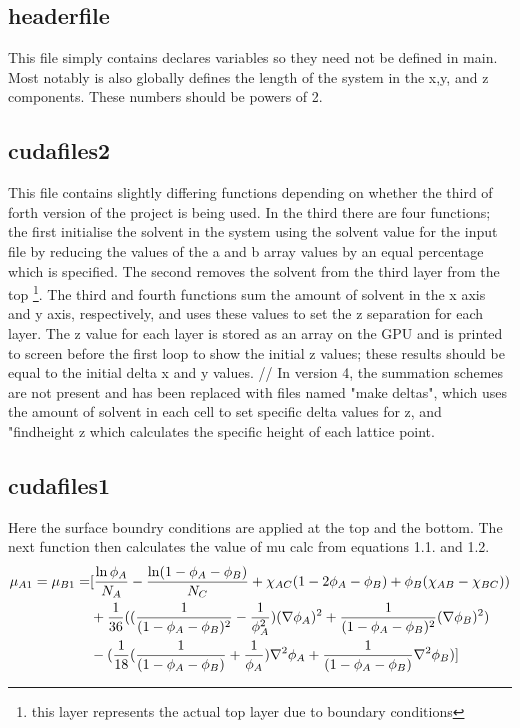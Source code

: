 \documentclass{article}
\numberwithin{equation}{section} %
\begin{document}
\subsection{headerfile} This file simply contains declares variables so they need not be defined in main. Most notably is also globally defines the length of the system in the x,y, and z components. These numbers should be powers of 2. 

\subsection{cudafiles2} This file contains slightly differing functions depending on whether the third of forth version of the project is being used. In the third there are four functions; the first initialise the solvent in the system using the solvent value for the input file by reducing the values of the a and b array values by an equal percentage which is specified. The second removes the solvent from the third layer from the top \footnote{this layer represents the actual top layer due to boundary conditions}. The third  and fourth functions sum the amount of solvent in the x axis and y axis, respectively, and uses these values to set the z separation for each layer. The z value for each layer is stored as an array on the GPU and is printed to screen before the first loop to show the initial z values; these results should be equal to the initial delta x and y values. //
In version 4, the summation schemes are not present and has been replaced with files named "make deltas", which uses the amount of solvent in each cell to set specific delta values for z, and "find\textunderscore height \textunderscore z which calculates the specific height of each lattice point. 

\subsection{cudafiles1}  Here the surface boundry conditions are applied at the top and the bottom. The next function then calculates the value of mu calc from equations 1.1. and 1.2.  \begin{align}
\mu _{A1} = \mu _{B1} = &[\frac{\ln \phi _{A}}{N_{A}} - \frac{\ln (1- \phi _{A} - \phi _{B})}{N_{C}}+\chi _{AC}(1-2\phi _{A} - \phi _{B})+\phi _{B}(\chi _{AB} - \chi _{BC}))  \notag \\
& + \frac{1}{36}((\frac{1}{(1 - \phi _{A} - \phi _{B})^2} - \frac{1}{\phi _{A}^2})(\nabla \phi _{A})^2 +\frac{1}{(1-\phi _{A} - \phi _{B})^2}(\nabla \phi _{B})^2) \notag \\
& -(\frac{1}{18}(\frac{1}{(1- \phi _{A} - \phi _{B})} + \frac{1}{\phi _{A}})\nabla ^2\phi _{A} + \frac{1}{(1 - \phi _{A} - \phi _{B})}\nabla ^2\phi _{B})]
\end{align}
\end{document}
